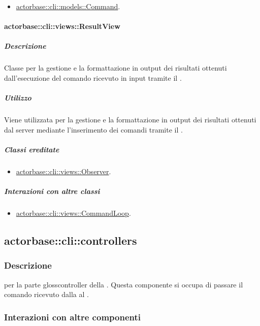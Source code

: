 \documentclass{scalatekids-article}
\begin{document}
\begin{itemize}
\item \hyperref[sec:actorbase::cli::models::Command]{actorbase::cli::models::Command}.
\end{itemize}

\paragraph{actorbase::cli::views::ResultView}
\label{sec:actorbase::cli::views::ResultView}

\subparagraph{Descrizione}

Classe per la gestione e la formattazione in output dei risultati ottenuti
dall'esecuzione del comando ricevuto in input tramite il  .

\subparagraph{Utilizzo}

Viene utilizzata per la gestione e la formattazione in output dei risultati
ottenuti dal server mediante l'inserimento dei comandi tramite il
 .

\subparagraph{Classi ereditate}

\begin{itemize}
\item \hyperref[sec:actorbase::cli::views::Observer]{actorbase::cli::views::Observer}.
\end{itemize}

\subparagraph{Interazioni con altre classi}

\begin{itemize}
\item \hyperref[sec:actorbase::cli::views::CommandLoop]{actorbase::cli::views::CommandLoop}.
\end{itemize}

\subsection{actorbase::cli::controllers}
\label{sec:actorbase::cli::controllers}

\subsubsection{Descrizione}

 per la parte gloss{controller} della . Questa
componente si occupa di passare il comando ricevuto dalla  al
.

\subsubsection{Interazioni con altre componenti}
\end{document}
